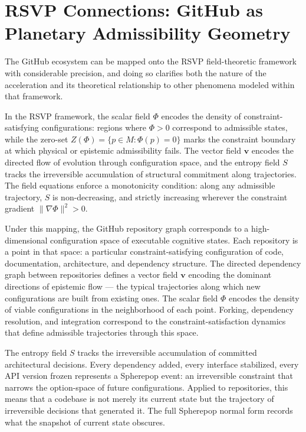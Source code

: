 \documentclass[12pt]{article}
\begin{document}
\section{RSVP Connections: GitHub as Planetary Admissibility Geometry}

The GitHub ecosystem can be mapped onto the RSVP field-theoretic framework with
considerable precision, and doing so clarifies both the nature of the
acceleration and its theoretical relationship to other phenomena modeled within
that framework.

In the RSVP framework, the scalar field $\Phi$ encodes the density of
constraint-satisfying configurations: regions where $\Phi > 0$ correspond to
admissible states, while the zero-set $Z(\Phi) = \{p \in M : \Phi(p) = 0\}$
marks the constraint boundary at which physical or epistemic admissibility fails.
The vector field $\mathbf{v}$ encodes the directed flow of evolution through
configuration space, and the entropy field $S$ tracks the irreversible
accumulation of structural commitment along trajectories. The field equations
enforce a monotonicity condition: along any admissible trajectory, $S$ is
non-decreasing, and strictly increasing wherever the constraint gradient
$\|\nabla\Phi\|^2 > 0$.

Under this mapping, the GitHub repository graph corresponds to a
high-dimensional configuration space of executable cognitive states. Each
repository is a point in that space: a particular constraint-satisfying
configuration of code, documentation, architecture, and dependency structure.
The directed dependency graph between repositories defines a vector field
$\mathbf{v}$ encoding the dominant directions of epistemic flow --- the typical
trajectories along which new configurations are built from existing ones. The
scalar field $\Phi$ encodes the density of viable configurations in the
neighborhood of each point. Forking, dependency resolution, and integration
correspond to the constraint-satisfaction dynamics that define admissible
trajectories through this space.

The entropy field $S$ tracks the irreversible accumulation of committed
architectural decisions. Every dependency added, every interface stabilized,
every API version frozen represents a Spherepop event: an irreversible constraint
that narrows the option-space of future configurations. Applied to repositories,
this means that a codebase is not merely its current state but the trajectory of
irreversible decisions that generated it. The full Spherepop normal form records
what the snapshot of current state obscures.
\end{document}
